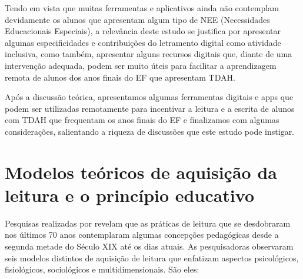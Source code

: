 \documentclass{textolivre}
\begin{document}
Tendo em vista que muitas ferramentas e aplicativos ainda não contemplam devidamente os alunos que apresentam algum tipo de NEE (Necessidades Educacionais Especiais), a relevância deste estudo se justifica por apresentar algumas especificidades e contribuições do letramento digital como atividade inclusiva, como também, apresentar alguns recursos digitais que, diante de uma intervenção adequada, podem ser muito úteis para facilitar a aprendizagem remota de alunos dos anos finais do EF que apresentam TDAH.

Após a discussão teórica, apresentamos algumas ferramentas digitais e apps que podem ser utilizadas remotamente para incentivar a leitura e a escrita de alunos com TDAH que frequentam os anos finais do EF e finalizamos com algumas considerações, salientando a riqueza de discussões que este estudo pode instigar.

\section{Modelos teóricos de aquisição da leitura e o princípio educativo}\label{sec-modelos}
Pesquisas realizadas por \textcite{alexander_2004} revelam que as práticas de leitura que se desdobraram nos últimos 70 anos contemplaram algumas concepções pedagógicas desde a segunda metade do Século XIX até os dias atuais. As pesquisadoras observaram seis modelos distintos de aquisição de leitura que enfatizam aspectos psicológicos, fisiológicos, sociológicos e multidimensionais. São eles: 
\end{document}
